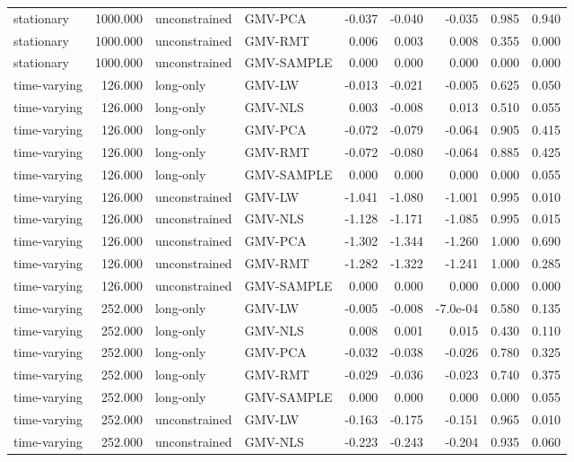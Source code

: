 \begin{table}[t]
{\begin{tabular}{lrllrrrrr}
stationary & 1000.000 & unconstrained & GMV-PCA & -0.037 & -0.040 & -0.035 & 0.985 & 0.940 \\
stationary & 1000.000 & unconstrained & GMV-RMT & 0.006 & 0.003 & 0.008 & 0.355 & 0.000 \\
stationary & 1000.000 & unconstrained & GMV-SAMPLE & 0.000 & 0.000 & 0.000 & 0.000 & 0.000 \\
time-varying & 126.000 & long-only & GMV-LW & -0.013 & -0.021 & -0.005 & 0.625 & 0.050 \\
time-varying & 126.000 & long-only & GMV-NLS & 0.003 & -0.008 & 0.013 & 0.510 & 0.055 \\
time-varying & 126.000 & long-only & GMV-PCA & -0.072 & -0.079 & -0.064 & 0.905 & 0.415 \\
time-varying & 126.000 & long-only & GMV-RMT & -0.072 & -0.080 & -0.064 & 0.885 & 0.425 \\
time-varying & 126.000 & long-only & GMV-SAMPLE & 0.000 & 0.000 & 0.000 & 0.000 & 0.055 \\
time-varying & 126.000 & unconstrained & GMV-LW & -1.041 & -1.080 & -1.001 & 0.995 & 0.010 \\
time-varying & 126.000 & unconstrained & GMV-NLS & -1.128 & -1.171 & -1.085 & 0.995 & 0.015 \\
time-varying & 126.000 & unconstrained & GMV-PCA & -1.302 & -1.344 & -1.260 & 1.000 & 0.690 \\
time-varying & 126.000 & unconstrained & GMV-RMT & -1.282 & -1.322 & -1.241 & 1.000 & 0.285 \\
time-varying & 126.000 & unconstrained & GMV-SAMPLE & 0.000 & 0.000 & 0.000 & 0.000 & 0.000 \\
time-varying & 252.000 & long-only & GMV-LW & -0.005 & -0.008 & -7.0e-04 & 0.580 & 0.135 \\
time-varying & 252.000 & long-only & GMV-NLS & 0.008 & 0.001 & 0.015 & 0.430 & 0.110 \\
time-varying & 252.000 & long-only & GMV-PCA & -0.032 & -0.038 & -0.026 & 0.780 & 0.325 \\
time-varying & 252.000 & long-only & GMV-RMT & -0.029 & -0.036 & -0.023 & 0.740 & 0.375 \\
time-varying & 252.000 & long-only & GMV-SAMPLE & 0.000 & 0.000 & 0.000 & 0.000 & 0.055 \\
time-varying & 252.000 & unconstrained & GMV-LW & -0.163 & -0.175 & -0.151 & 0.965 & 0.010 \\
time-varying & 252.000 & unconstrained & GMV-NLS & -0.223 & -0.243 & -0.204 & 0.935 & 0.060 \\

\end{tabular}}
\end{table}
